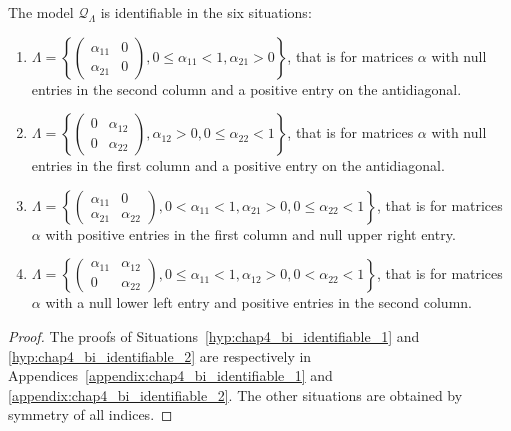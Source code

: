       \begin{proposition}\label{prop:chap4_bi_identifiable}
      	The model $\mathcal Q_\Lambda$ is identifiable in the six situations:
        \begin{enumerate}
          \item \label{hyp:chap4_bi_identifiable_1} $\Lambda = \left\{ \begin{pmatrix} \alpha_{11} & 0 \\ \alpha_{21} & 0 \end{pmatrix}, 0 \le \alpha_{11} < 1, \alpha_{21} > 0 \right\}$, that is for matrices $\alpha$ with null entries in the second column and a positive entry on the antidiagonal.
          \item \label{hyp:chap4_bi_identifiable_1_bis} $\Lambda = \left\{ \begin{pmatrix} 0 & \alpha_{12} \\ 0 & \alpha_{22} \end{pmatrix}, \alpha_{12} > 0, 0 \le \alpha_{22} < 1 \right\}$, that is for matrices $\alpha$ with null entries in the first column and a positive entry on the antidiagonal.
          \item \label{hyp:chap4_bi_identifiable_2} $\Lambda = \left\{ \begin{pmatrix} \alpha_{11} & 0 \\ \alpha_{21} & \alpha_{22} \end{pmatrix}, 0 < \alpha_{11} < 1, \alpha_{21} > 0 , 0 \le \alpha_{22} < 1 \right\}$, that is for matrices $\alpha$ with positive entries in the first column and null upper right entry.
          \item \label{hyp:chap4_bi_identifiable_2_bis} $\Lambda = \left\{ \begin{pmatrix} \alpha_{11} & \alpha_{12} \\ 0 & \alpha_{22} \end{pmatrix}, 0 \le \alpha_{11} < 1, \alpha_{12} > 0, 0 < \alpha_{22} < 1 \right\}$, that is for matrices $\alpha$ with a null lower left entry and positive entries in the second column.
        \end{enumerate}
      \end{proposition}
      \begin{proof}
        The proofs of Situations~\ref{hyp:chap4_bi_identifiable_1} and \ref{hyp:chap4_bi_identifiable_2} are respectively in Appendices~\ref{appendix:chap4_bi_identifiable_1} and \ref{appendix:chap4_bi_identifiable_2}.
        The other situations are obtained by symmetry of all indices.
      \end{proof}
      
